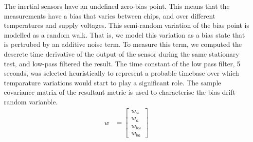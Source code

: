 \documentclass[]{article}
\begin{document}
{The inertial sensors have an undefined zero-bias point. This means that the measurements have a bias that varies between chips, and over different temperatures and supply voltages. This semi-random variation of the bias point is modelled as a random walk. That is, we model this variation as a bias state that is pertrubed by an additive noise term.
To measure this term, we computed the descrete time derivative of the output of the sensor during the same stationary test, and low-pass filtered the result. The time constant of the low pass filter, 5 seconds, was selected heuristically to represent a probable timebase over which temparature variations would start to play a significant role. The sample covariance matrix of the resultant metric is used to characterise the bias drift random varianble.
\begin{align}
	\label{eqn:proc_noise_def}
	w &= 
	\left[
	\begin{matrix}
		w_\omega \\
		w_a \\
		w_{b\omega} \\
		w_{ba}
	\end{matrix}
	\right]
\end{align}

}
\end{document}
